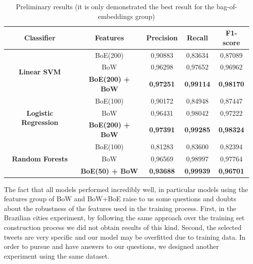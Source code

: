\begin{table}[!bp]
	\centering
	\caption[New York City First Experiment Results]{Preliminary results (it is only demonstrated the best result for the bag-of-embeddings group)}
	\label{tab:first_experiment}
	\begin{tabular}{|c|c|c|c|c|}
		\hline
		\textbf{Classifier} & \textbf{Features} & \textbf{Precision} & \textbf{Recall} & \textbf{F1-score} \\ \hline
		\multirow{3}{*}{\textbf{Linear SVM}} & BoE(200) & 0,90883 & 0,83634 & 0,87089 \\
		& BoW & 0,96298 & 0,97652 & 0,96962 \\
		& \textbf{BoE(200) + BoW} & \textbf{0,97251} & \textbf{0,99114} & \textbf{0,98170} \\ \hline
		\multirow{3}{*}{\textbf{Logistic Regression}} & BoE(100) & 0,90172 & 0,84948 & 0,87447 \\
		& BoW & 0,96431 & 0,98042 & 0,97222 \\
		& \textbf{BoE(200) + BoW} & \textbf{0,97391} & \textbf{0,99285} & \textbf{0,98324} \\ \hline
		\multirow{3}{*}{\textbf{Random Forests}} & BoE(100) & 0,81283 & 0,83600 & 0,82394 \\
		& BoW & 0,96569 & 0,98997 & 0,97764 \\
		& \textbf{BoE(50) + BoW} & \textbf{0,93688} & \textbf{0,99939} & \textbf{0,96701} \\ \hline
	\end{tabular}
\end{table}

The fact that all models performed incredibly well, in particular models using the features group of \gls{BoW} and \gls{BoW}+\gls{BoE} raise to us some questions and doubts about the robustness of the features used in the training process. First, in the Brazilian cities experiment, by following the same approach over the training set construction process we did not obtain results of this kind. Second, the selected tweets are very specific and our model may be overfitted due to training data. In order to pursue and have answers to our questions, we designed another experiment using the same dataset.

